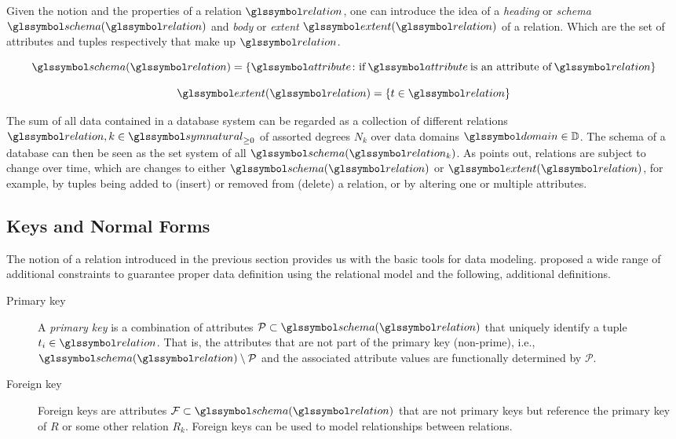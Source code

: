 Given the notion and the properties of a relation $\relation$, one can introduce the idea of a \emph{heading} or \emph{schema} $\schema(\relation)$ and \emph{body} or \emph{extent} $\extent(\relation)$ of a relation. Which are the set of attributes and tuples respectively that make up $\relation$.

\begin{equation}
    \schema (\relation) = \lbrace \attribute \colon \textrm{if} \: \attribute \: \textrm{is an attribute of} \: \relation \rbrace
\end{equation}

\begin{equation}
    \extent (\relation) = \lbrace t \in \relation \rbrace
\end{equation}

The sum of all data contained in a database system can be regarded as a collection of different relations $\relation, k \in \symnatural_{\geq 0}$ of assorted degrees $N_k$ over data domains $\domain \in \mathbb{D}$. The schema of a database can then be seen as the set system of all $\schema(\relation_k)$. As \cite{Codd:1970Relational} points out, relations are subject to change over time, which are changes to either $\schema(\relation)$ or $\extent(\relation)$, for example, by tuples being added to (insert) or removed from (delete) a relation, or by altering one or multiple attributes.


\subsection{Keys and Normal Forms}

The notion of a relation introduced in the previous section provides us with the basic tools for data modeling. \cite{Codd:1970Relational} proposed a wide range of additional constraints to guarantee proper data definition using the relational model and the following, additional definitions. 

\begin{description}
    \item[Primary key] A \emph{primary key} is a combination of attributes $\mathcal{P} \subset \schema(\relation)$ that uniquely identify a tuple $t_i \in \relation$. That is, the attributes that are not part of the primary key (non-prime), i.e., $\schema(\relation) \setminus \mathcal{P}$ and the associated attribute values are functionally determined by $\mathcal{P}$.
    \item[Foreign key] Foreign keys are attributes $\mathcal{F} \subset \schema(\relation)$ that are not primary keys but reference the primary key of $R$ or some other relation $R_k$. Foreign keys can be used to model relationships between relations.
\end{description}

